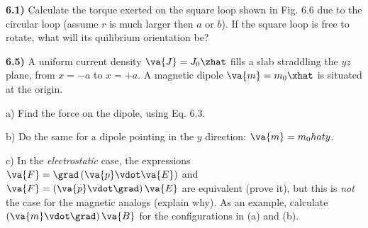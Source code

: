 \documentclass[12pt,a4paper]{article}
\newcommand{\prob}[2]{\textbf{#1)} #2}
\begin{document}
\prob{6.1}{Calculate the torque exerted on the square loop shown in Fig. 6.6 due to the circular loop (assume $r$ is much larger then $a$ or $b$). If the square loop is free to rotate, what will its quilibrium orientation be?}



\prob{6.5}{A uniform current density $\va{J} = J_0 \zhat$ fills a slab straddling the $yz$ plane, from $x = -a$ to $x = +a$.
A magnetic dipole $\va{m} = m_0 \xhat$ is situated at the origin.}

a) Find the force on the dipole, using Eq. 6.3.

b) Do the same for a dipole pointing in the $y$ direction: $\va{m} = m_0 \\hat{y}$.

c) In the \textit{electrostatic} case, the expressions $\va{F} = \grad \left( \va{p} \vdot \va{E} \right)$ and $\va{F} = \left( \va{p} \vdot \grad \right) \va{E}$ are equivalent (prove it), but this is \textit{not} the case for the magnetic analogs (explain why).
As an example, calculate $\left( \va{m} \vdot \grad \right) \va{B}$ for the configurations in (a) and (b).
\end{document}
